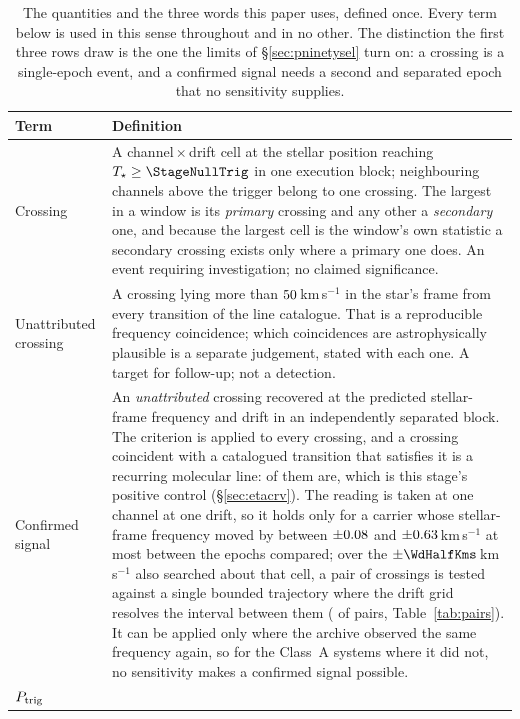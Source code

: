\begin{table}
\centering
\caption{The quantities and the three words this paper uses, defined once.
Every term below is used in this sense throughout and in no other. The
distinction the first three rows draw is the one the limits of
\S\ref{sec:pninetysel} turn on: a crossing is a single-epoch event, and a
confirmed signal needs a second and separated epoch that no sensitivity
supplies.}
\label{tab:quantities}
\small
\begin{tabular}{@{}p{}p{}@{}}
\hline
Term & Definition \\
\hline
Crossing &
A channel\,$\times$\,drift cell at the stellar position reaching
$T_\star\geq\StageNullTrig$ in one execution block; neighbouring channels
above the trigger belong to one crossing. The largest in a window is its
\emph{primary} crossing and any other a \emph{secondary} one, and because the
largest cell is the window's own statistic a secondary crossing exists only
where a primary one does. An event requiring investigation; no claimed
significance. \\
Unattributed crossing &
A crossing lying more than $50$\,km\,s$^{-1}$ in the star's frame
from every transition of the line catalogue. That is a reproducible frequency
coincidence; which coincidences are astrophysically plausible is a separate
judgement, stated with each one. A target for follow-up; not a detection. \\
Confirmed signal &
An \emph{unattributed} crossing recovered at the predicted stellar-frame
frequency and drift in an independently separated block. The criterion is
applied to every crossing, and a crossing coincident with a catalogued
transition that satisfies it is a recurring molecular line:
\MkAttrRecur{} of them are, which is this stage's positive control
(\S\ref{sec:etacrv}). The reading is taken at one channel at one drift, so it
holds only for a carrier whose stellar-frame frequency moved by between
$\pm0.08$ and $\pm0.63$\,km\,s$^{-1}$ at most between the epochs
compared; over the $\pm\WdHalfKms$\,km\,s$^{-1}$ also searched about that
cell, a pair of crossings is tested against a single bounded trajectory where
the drift grid resolves the interval between them (\TjNPower{} of \TjNPair{}
pairs, Table~\ref{tab:pairs}). It can be applied only where the archive
observed the same frequency again, so for the \RcNoRepSys{} Class~A systems
where it did not, no sensitivity makes a confirmed signal possible. \\
$P_{\rm trig}$ &

\end{tabular}
\end{table}
